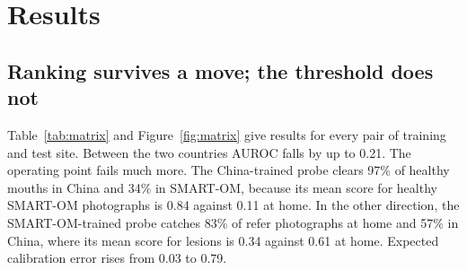\documentclass[11pt]{article}
\begin{document}
\section{Results}

\subsection{Ranking survives a move; the threshold does not}

Table~\ref{tab:matrix} and Figure~\ref{fig:matrix} give results for every pair of training and test site. Between the two countries AUROC falls by up to 0.21. The operating point fails much more. The China-trained probe clears 97\% of healthy mouths in China and 34\% in SMART-OM, because its mean score for healthy SMART-OM photographs is 0.84 against 0.11 at home. In the other direction, the SMART-OM-trained probe catches 83\% of refer photographs at home and 57\% in China, where its mean score for lesions is 0.34 against 0.61 at home. Expected calibration error rises from 0.03 to 0.79.
\end{document}
